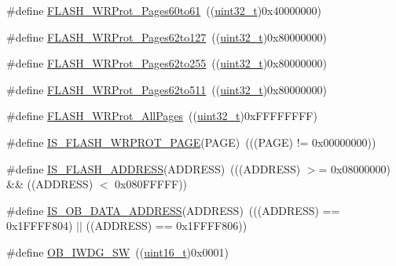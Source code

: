 \begin{DoxyCompactItemize}
\#define \hyperlink{group___option___bytes___write___protection_ga22f620be7f346efcb2cbb732b879fd0c}{F\+L\+A\+S\+H\+\_\+\+W\+R\+Prot\+\_\+\+Pages60to61}~((\hyperlink{_p_e___types_8h_a33594304e786b158f3fb30289278f5af}{uint32\+\_\+t})0x40000000)
\item 
\#define \hyperlink{group___option___bytes___write___protection_ga346285408d8f738796fc22d710777ba9}{F\+L\+A\+S\+H\+\_\+\+W\+R\+Prot\+\_\+\+Pages62to127}~((\hyperlink{_p_e___types_8h_a33594304e786b158f3fb30289278f5af}{uint32\+\_\+t})0x80000000)
\item 
\#define \hyperlink{group___option___bytes___write___protection_gacec4a825ff505ef5751ec6e5cf6d941e}{F\+L\+A\+S\+H\+\_\+\+W\+R\+Prot\+\_\+\+Pages62to255}~((\hyperlink{_p_e___types_8h_a33594304e786b158f3fb30289278f5af}{uint32\+\_\+t})0x80000000)
\item 
\#define \hyperlink{group___option___bytes___write___protection_gab233da6081eaf5d664f16c0e8c7df138}{F\+L\+A\+S\+H\+\_\+\+W\+R\+Prot\+\_\+\+Pages62to511}~((\hyperlink{_p_e___types_8h_a33594304e786b158f3fb30289278f5af}{uint32\+\_\+t})0x80000000)
\item 
\#define \hyperlink{group___option___bytes___write___protection_ga6fdaf38a559d606660dd10a411b77ea5}{F\+L\+A\+S\+H\+\_\+\+W\+R\+Prot\+\_\+\+All\+Pages}~((\hyperlink{_p_e___types_8h_a33594304e786b158f3fb30289278f5af}{uint32\+\_\+t})0x\+F\+F\+F\+F\+F\+F\+F\+F)
\item 
\#define \hyperlink{group___option___bytes___write___protection_gafe68b93dfb1ebf68d74f871850ab373b}{I\+S\+\_\+\+F\+L\+A\+S\+H\+\_\+\+W\+R\+P\+R\+O\+T\+\_\+\+P\+A\+GE}(P\+A\+GE)~(((P\+A\+GE) != 0x00000000))
\item 
\#define \hyperlink{group___option___bytes___write___protection_gad0c8166ba15a0b8d458412a8bb74e2f0}{I\+S\+\_\+\+F\+L\+A\+S\+H\+\_\+\+A\+D\+D\+R\+E\+SS}(A\+D\+D\+R\+E\+SS)~(((A\+D\+D\+R\+E\+SS) $>$= 0x08000000) \&\& ((\+A\+D\+D\+R\+E\+S\+S) $<$ 0x080\+F\+F\+F\+F\+F))
\item 
\#define \hyperlink{group___option___bytes___write___protection_ga73fcac8d5f301a5c98518374ae926633}{I\+S\+\_\+\+O\+B\+\_\+\+D\+A\+T\+A\+\_\+\+A\+D\+D\+R\+E\+SS}(A\+D\+D\+R\+E\+SS)~(((A\+D\+D\+R\+E\+SS) == 0x1\+F\+F\+F\+F804) $\vert$$\vert$ ((\+A\+D\+D\+R\+E\+S\+S) == 0x1\+F\+F\+F\+F806))
\item 
\#define \hyperlink{group___option___bytes___i_watchdog_ga5a357e232c955444c3f2ccb9a937ffce}{O\+B\+\_\+\+I\+W\+D\+G\+\_\+\+SW}~((\hyperlink{_p_e___types_8h_a1f1825b69244eb3ad2c7165ddc99c956}{uint16\+\_\+t})0x0001)
\item 
$$
\end{DoxyCompactItemize}
